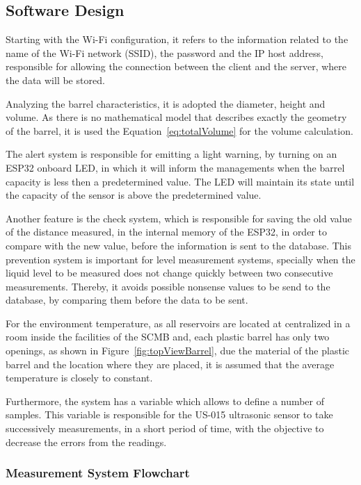 \subsection{Software Design}

Starting with the Wi-Fi configuration, it refers to the information related to the name of the Wi-Fi network (SSID), the password and the \gls{IP} host address, responsible for allowing the connection between the client and the server, where the data will be stored. 

Analyzing the barrel characteristics, it is adopted the diameter, height and volume. As there is no mathematical model that describes exactly the geometry of the barrel, it is used the Equation~\ref{eq:totalVolume} for the volume calculation.

The alert system is responsible for emitting a light warning, by turning on an ESP32 onboard \gls{LED}, in which it will inform the managements when the barrel capacity is less then a predetermined value. The \gls{LED} will maintain its state until the capacity of the sensor is above the predetermined value.

Another feature is the check system, which is responsible for saving the old value of the distance measured, in the internal memory of the ESP32, in order to compare with the new value, before the information is sent to the database. This prevention system is important for level measurement systems, specially when the liquid level to be measured does not change quickly between two consecutive measurements. Thereby, it avoids possible nonsense values to be send to the database, by comparing them before the data to be sent.

For the environment temperature, as all reservoirs are located at centralized in a room inside the facilities of the \gls{SCMB} and, each plastic barrel has only two openings, as shown in Figure~\ref{fig:topViewBarrel}, due the material of the plastic barrel and the location where they are placed, it is assumed that the average temperature is closely to constant.

Furthermore, the system has a variable which allows to define a number of samples. This variable is responsible for the US-015 ultrasonic sensor to take successively measurements, in a short period of time, with the objective to decrease the errors from the readings. 


\subsubsection{Measurement System Flowchart}

